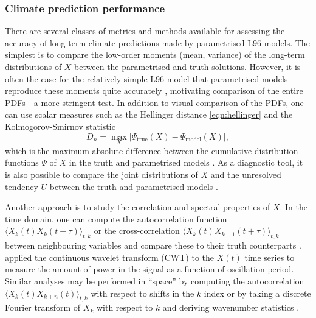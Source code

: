 \documentclass[titlepage,twoside]{article}
\numberwithin{equation}{section}
\begin{document}
\subsubsection{Climate prediction performance}
There are several classes of metrics and methods available for assessing the
accuracy of long-term climate predictions made by parametrised L96 models. The
simplest is to compare the low-order moments (mean, variance) of the long-term
distributions of $X$ between the parametrised and truth solutions. However, it
is often the case for the relatively simple L96 model that parametrised models
reproduce these moments quite accurately \parencite{wilks2005}, motivating
comparison of the entire PDFs---a more stringent test. In addition to visual
comparison of the PDFs, one can use scalar measures such as the Hellinger
distance \cref{eqn:hellinger} \parencite{arnold2013,gagne2020} and the
Kolmogorov-Smirnov statistic
\begin{equation*}
    D_n = \max_X |\Psi_\mathrm{true}(X) - \Psi_\mathrm{model}(X)|,
\end{equation*}
which is the maximum absolute difference between the cumulative distribution
functions $\Psi$ of $X$ in the truth and parametrised models
\parencite{wilks2005,chorin2015,kwasniok2012}. As a diagnostic tool, it is
also possible to compare the joint distributions of $X$ and the unresolved
tendency $U$ between the truth and parametrised models \parencite{gagne2020}.

Another approach is to study the correlation and spectral properties of $X$. In
the time domain, one can compute the autocorrelation function $\langle X_k(t)
X_k(t + \tau) \rangle_{t,k}$ or the cross-correlation $\langle X_k(t) X_{k+1}(t
+ \tau) \rangle_{t,k}$ between neighbouring variables and compare these to
their truth counterparts
\parencite{crommelin2008,kwasniok2012,chorin2015,gagne2020}.
\textcite{gagne2020} applied the continuous wavelet transform (CWT) to the
$X(t)$ time series to measure the amount of power in the signal as a function
of oscillation period. Similar analyses may be performed in ``space'' by
computing the autocorrelation $\langle X_k(t) X_{k+n}(t) \rangle_{t,k}$ with
respect to shifts in the $k$ index \parencite{gagne2020} or by taking a
discrete Fourier transform of $X_k$ with respect to $k$ and deriving
wavenumber statistics \parencite{crommelin2008,kwasniok2012}.
\end{document}
